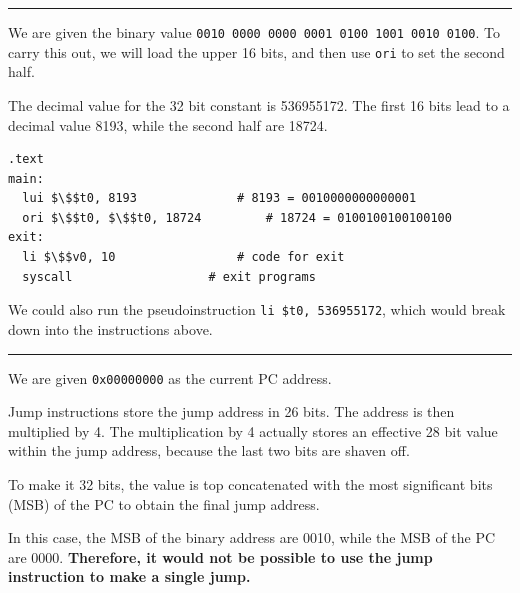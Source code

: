 \documentclass[11pt]{exam}
\newcommand{\cc}[1]{\texttt{#1}}
\newcounter{questionCounter}
\newcounter{partCounter}[questionCounter]
\newenvironment{namedquestion}[1]{%
    \addtocounter{questionCounter}{1}%
    \setcounter{partCounter}{0}%
    \vspace{.2in}%
        \noindent{\bf #1}%
    \vspace{0.3em} \hrule \vspace{.1in}%
}{}
\begin{document}
\begin{namedquestion}{Question 2.39}

We are given the binary value \cc{0010 0000 0000 0001 0100 1001 0010 0100}. To carry this out, we will load the upper 16 bits, and then use \cc{ori} to set the second half.

The decimal value for the 32 bit constant is 536955172. The first 16 bits lead to a decimal value 8193, while the second half are 18724. 

\begin{lstlisting}
.text
main: 
  lui $\$$t0, 8193              # 8193 = 0010000000000001
  ori $\$$t0, $\$$t0, 18724         # 18724 = 0100100100100100
exit:
  li $\$$v0, 10                 # code for exit
  syscall                   # exit programs  
\end{lstlisting}

We could also run the pseudoinstruction \cc{li \$t0, 536955172}, which would break down into the instructions above.
\end{namedquestion}

\begin{namedquestion}{Question 2.40}

We are given \cc{0x00000000} as the current PC address.

Jump instructions store the jump address in 26 bits. The address is then multiplied by 4. The multiplication by 4 actually stores an effective 28 bit value within the jump address, because the last two bits are shaven off. 

To make it 32 bits, the value is top concatenated with the most significant bits (MSB) of the PC to obtain the final jump address. 

In this case, the MSB of the binary address are 0010, while the MSB of the PC are 0000. \textbf{Therefore, it would not be possible to use the jump instruction to make a single jump.}
\end{namedquestion}
\end{document}
